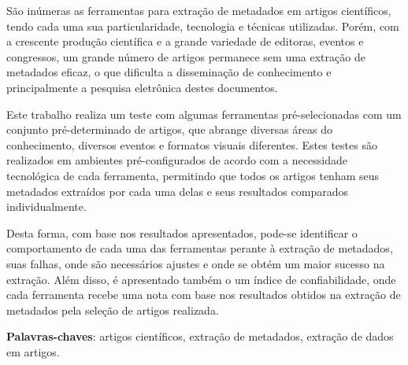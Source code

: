 
\setlength{\absparsep}{18pt} %
\begin{resumo}


São inúmeras as ferramentas para extração de metadados em artigos científicos, tendo cada uma sua particularidade, tecnologia e técnicas utilizadas. Porém, com a crescente produção científica e a grande variedade de editoras, eventos e congressos, um grande número de artigos permanece sem uma extração de metadados eficaz, o que dificulta a disseminação de conhecimento e principalmente a pesquisa eletrônica destes documentos.

Este trabalho realiza um teste com algumas ferramentas pré-selecionadas com um conjunto pré-determinado de artigos, que abrange diversas áreas do conhecimento, diversos eventos e formatos visuais diferentes. Estes testes são realizados em ambientes pré-configurados de acordo com a necessidade tecnológica de cada ferramenta, permitindo que todos os artigos tenham seus metadados extraídos por cada uma delas e seus resultados comparados individualmente. 

Desta forma, com base nos resultados apresentados, pode-se identificar o comportamento de cada uma das ferramentas perante à extração de metadados, suas falhas, onde são necessários ajustes e onde se obtém um maior sucesso na extração. Além disso, é apresentado também o um índice de confiabilidade, onde cada ferramenta recebe uma nota com base nos resultados obtidos na extração de metadados pela seleção de artigos realizada.

\textbf{Palavras-chaves}: artigos científicos, extração de metadados, extração de dados em artigos.

\end{resumo}

